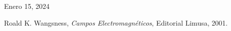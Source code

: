 \documentclass{article}
\begin{document}
        {Enero 15, 2024}
    \tableofcontents
    
    
    
    
    \begin{thebibliography}{99}
        \bibitem{}
        Roald K. Wangsness,
        \emph{Campos Electromagnéticos},
        Editorial Limusa,
        2001.
    \end{thebibliography}
    
\end{document}
